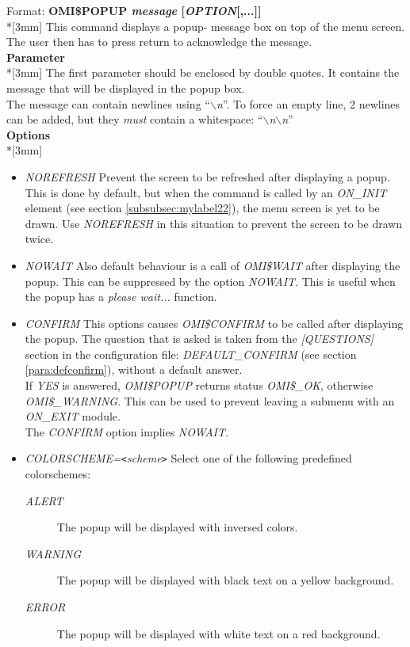 \documentclass[a4paper]{book}
\newcommand{\lt}{\texttt{<}}
\newcommand{\gt}{\texttt{>}}
\renewcommand{\indent}{\hspace*{5mm}}
\begin{document}
\indent Format: \textbf{OMI{\$}POPUP \textit{message} [\textit{OPTION}[,...]]}\\*[3mm]
This command displays a popup- message box on top of the menu screen. The 
user then has to press return to acknowledge the message.\\[3mm]
\textbf{Parameter}\\*[3mm]
The first parameter should be enclosed by double quotes. It contains the 
message that will be displayed in the popup box.\\
The message can contain newlines using ``\textsl{\ensuremath{\backslash}n}''. To force an empty line, 2 newlines can be added, but they \textit{must} contain a whitespace: ``\textsl{\ensuremath{\backslash}n\textvisiblespace\ensuremath{\backslash}n}''\\[3mm]
\textbf{Options}\\*[3mm]
\begin{itemize}
\item \textsl{NOREFRESH} Prevent the screen to be refreshed after displaying a popup.
This is done by default, but when the command is called by an 
\textsl{ON{\_}INIT} element (see section \ref{subsubsec:mylabel22}), the menu 
screen is yet to be drawn. Use \textsl{NOREFRESH} in this situation to prevent the screen to be drawn twice.

\item \textsl{NOWAIT} Also default behaviour is a call of \textsl{OMI{\$}WAIT} after displaying
the popup. This can be suppressed by the option \textsl{NOWAIT}. This is useful
when the popup has a \textit{please wait...} function.

\item \textsl{CONFIRM} This options causes \textsl{OMI{\$}CONFIRM} to be called after displaying the popup. The  question that is asked is taken from the \textsl{[QUESTIONS]} section in the configuration file: \textsl{DEFAULT{\_}CONFIRM} (see section \ref{para:defconfirm}), without a default answer.\\
If \textsl{YES} is answered, \textsl{OMI{\$}POPUP} returns status \textsl{OMI{\$}{\_}OK}, otherwise \textsl{OMI{\$}{\_}WARNING}. This can be used to prevent leaving a submenu with an \textsl{ON{\_}EXIT} module.\\
The \textsl{CONFIRM} option implies \textsl{NOWAIT}.

\item \textsl{COLORSCHEME=\textit{\lt scheme\gt }} Select one of the following predefined colorschemes:\\
{\begin{description}
\item[\textsl{ALERT}] The popup will be displayed with inversed colors.
\item[\textsl{WARNING}] The popup will be displayed with black text on a yellow background.
\item[\textsl{ERROR}] The popup will be displayed with white text on a red background.
\end{description}}
\end{itemize}
\end{document}
